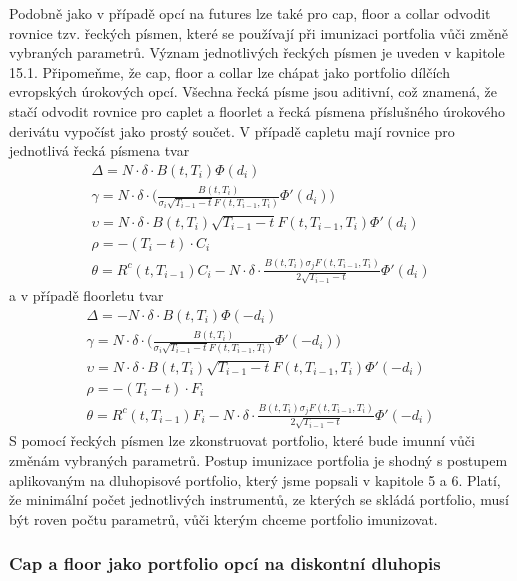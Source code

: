 \documentclass[a4paper]{book}
\begin{document}
Podobně jako v případě opcí na futures lze také pro cap, floor a collar odvodit rovnice tzv. řeckých písmen, které se používají při imunizaci portfolia vůči změně vybraných parametrů. Význam jednotlivých řeckých písmen je uveden v kapitole 15.1. Připomeňme, že cap, floor a collar lze chápat jako portfolio dílčích evropských úrokových opcí. Všechna řecká písme jsou aditivní, což znamená, že stačí odvodit rovnice pro caplet a floorlet a řecká písmena příslušného úrokového derivátu vypočíst jako prostý součet. V případě capletu mají rovnice pro jednotlivá řecká písmena tvar
\begin{gather*}
\Delta = N \cdot \delta \cdot B(t,T_i)\Phi(d_i)\\
\gamma = N \cdot \delta \cdot \Bigg( \frac{B(t, T_i)}{\sigma_i \sqrt{T_{i-1} - t}F(t, T_{i-1}, T_i)}\Phi'(d_i) \Bigg)\\
\upsilon = N \cdot \delta \cdot B(t, T_i) \sqrt{T_{i-1}-t}F(t, T_{i-1}, T_i)\Phi'(d_i)\\
\rho = -(T_i - t) \cdot C_i\\
\theta = R^c(t, T_{i-1}) C_i - N \cdot \delta \cdot \frac{B(t, T_i) \sigma_j F(t, T_{i-1}, T_i)}{2 \sqrt{T_{i-1}-t}}\Phi'(d_i)
\end{gather*}
a v případě floorletu tvar
\begin{gather*}
\Delta = -N \cdot \delta \cdot B(t,T_i)\Phi(-d_i)\\
\gamma = N \cdot \delta \cdot \Bigg( \frac{B(t, T_i)}{\sigma_i \sqrt{T_{i-1} - t}F(t, T_{i-1}, T_i)}\Phi'(-d_i) \Bigg)\\
\upsilon = N \cdot \delta \cdot B(t, T_i) \sqrt{T_{i-1}-t}F(t, T_{i-1}, T_i)\Phi'(-d_i)\\
\rho = -(T_i - t) \cdot F_i\\
\theta = R^c(t, T_{i-1}) F_i - N \cdot \delta \cdot \frac{B(t, T_i) \sigma_j F(t, T_{i-1}, T_i)}{2 \sqrt{T_{i-1}-t}}\Phi'(-d_i)
\end{gather*}
S pomocí řeckých písmen lze zkonstruovat portfolio, které bude imunní vůči změnám vybraných parametrů. Postup imunizace portfolia je shodný s postupem aplikovaným na dluhopisové portfolio, který jsme popsali v kapitole 5 a 6. Platí, že minimální počet jednotlivých instrumentů, ze kterých se skládá portfolio, musí být roven počtu parametrů, vůči kterým chceme portfolio imunizovat.

\subsubsection{Cap a floor jako portfolio opcí na diskontní dluhopis}
\end{document}
